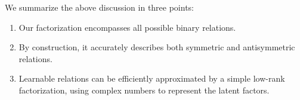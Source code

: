 \documentclass{article}
\newcommand{\proba}{P}
\newcommand{\real}{\mathrm{Re}}
\newcommand{\imag}{\mathrm{Im}}
\begin{document}








We summarize the above discussion in three points:

\begin{enumerate}
    \item Our factorization encompasses all possible binary relations.
    \item By construction, it accurately describes both symmetric and antisymmetric relations.
    \item Learnable relations can be efficiently approximated
by a simple low-rank factorization, using complex numbers to represent the latent factors.
\end{enumerate}
\end{document}
